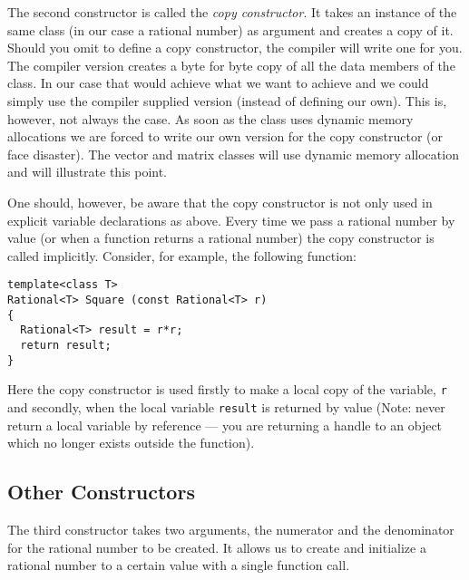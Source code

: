 The second constructor is called the {\em copy constructor}. It takes an instance of
the same class (in our case a rational number) as argument and creates a copy of
it. Should you omit to define a copy constructor, the compiler will write one for you.
The compiler version creates a byte for byte copy of all the data members of the class.
In our case that would achieve what we want to achieve and we could simply
use the compiler supplied version (instead of defining our own). This is, however, not 
always the case. As soon as the class uses dynamic memory allocations we are forced
to write our own version for the copy constructor (or face disaster). The vector and
matrix classes will use dynamic memory allocation and will illustrate this point. 

One should, however, be aware that the copy constructor is not only used in explicit
variable declarations as above. Every time we pass a rational number by value (or when 
a function returns a rational number) the copy constructor is called implicitly.
Consider, for example, the following function:
{\footnotesize \begin{verbatim}
template<class T>
Rational<T> Square (const Rational<T> r)
{
  Rational<T> result = r*r;
  return result;
}
\end{verbatim}}
Here the copy constructor is used firstly to make a local copy of the variable, \verb+r+
and secondly, when the local variable \verb+result+ is returned by value (Note: never
return a local variable by reference --- you are returning a handle to an object which
no longer exists outside the function).


\subsection{Other Constructors}

The third constructor takes two arguments, the numerator and the denominator for
the rational number to be created. It allows us to create and initialize a rational number
to a certain value with a single function call.

